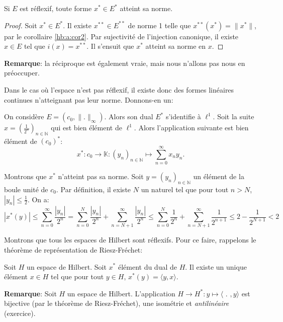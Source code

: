 \begin{prop}
  Si $E$ est réflexif, toute forme $x^*\in E^*$ atteint
  sa norme.
\end{prop}

\begin{proof}
  Soit $x^*\in E^*$. Il existe $x^{**}\in E^{**}$ de
  norme 1
  telle que $x^{**}(x^*)=\|x^*\|$, par le corollaire
  \ref{hb:a:cor2}. Par sujectivité de l'injection
  canonique, il existe $x\in E$ tel que $i(x)=x^{**}$.
  Il s'ensuit que $x^*$ atteint sa norme en $x$.
\end{proof}

\textbf{Remarque}: la réciproque est également vraie,
mais nous n'allons pas nous en préoccuper.

Dans le cas où l'espace n'est pas réflexif, il
existe donc des formes linéaires continues n'atteignant
pas leur norme. Donnons-en un:
\begin{ex}
  On considère $E = (c_0, \|.\|_\infty)$. Alors
  son dual $E^*$ s'identifie à $\ell^1$. Soit
  la suite $x = (\frac{1}{2^n})_{n\in \mathbb{N}}$
  qui est bien élément de $\ell^1$. Alors
  l'application suivante est bien élément de $(c_0)^*$:
  $$x^*:c_0\to\mathbb{K}:(y_n)_{n\in\mathbb{N}}\mapsto \sum_{n=0}^\infty x_ny_n.$$

  Montrons que $x^*$ n'atteint pas sa norme. Soit $y = (y_n)_{n\in\mathbb{N}}$
  un élément de la boule unité de $c_0$. Par définition, il existe
  $N$ un naturel tel que pour tout $n > N$, $|y_n|\leq \frac{1}{2}$. On a:
  $$|x^*(y)| \leq \sum_{n=0}^\infty \frac{|y_n|}{2^n} =
  \sum_{n=0}^{N} \frac{|y_n|}{2^n} + \sum_{n=N+1}^\infty \frac{|y_n|}{2^n}
  \leq \sum_{n=0}^{N} \frac{1}{2^n} + \sum_{n=N+1}^\infty \frac{1}{2^{n+1}}
  \leq 2 - \frac{1}{2^{N+1}}<2$$
\end{ex}

Montrons que tous les espaces de Hilbert sont réflexifs.
Pour ce faire, rappelons le théorème de représentation
de Riesz-Fréchet:
\begin{thm}
  Soit $H$ un espace de Hilbert. Soit $x^*$ élément du dual de $H$.
  Il existe un unique élément $x\in H$ tel que pour tout $y\in H$,
  $x^*(y) = \langle y, x\rangle$.
\end{thm}

\textbf{Remarque}: Soit $H$ un espace de Hilbert.
L'application $H\to H^*: y \mapsto \langle$ $.$ $, y\rangle$ est
bijective (par le théorème de Riesz-Fréchet), une isométrie
et \emph{antilinéaire} (exercice).

